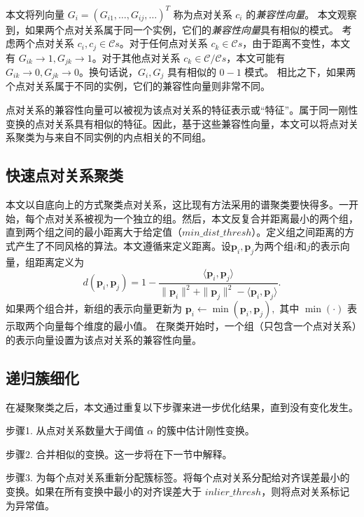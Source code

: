 本文将列向量 $G_i = (G_{i1}, \ldots , G_{ij}, \ldots)^T$ 称为点对关系 $c_i$ 的\emph{兼容性向量}。
本文观察到，如果两个点对关系属于同一个实例，它们的\emph{兼容性向量}具有相似的模式。
考虑两个点对关系 $c_i, c_j \in \mathcal{C}s$。对于任何点对关系 $c_k \in \mathcal{C}s$，由于距离不变性，本文有 $G_{ik} \rightarrow 1, G_{jk} \rightarrow 1$。对于其他点对关系 $c_k \in \mathcal{C}/\mathcal{C}s$，本文可能有 $G_{ik} \rightarrow 0, G_{jk} \rightarrow 0$。换句话说，$G_i,G_j$ 具有相似的 $0-1$ 模式。
相比之下，如果两个点对关系属于不同的实例，它们的兼容性向量则非常不同。

点对关系的兼容性向量可以被视为该点对关系的特征表示或“特征”。属于同一刚性变换的点对关系具有相似的特征。因此，基于这些兼容性向量，本文可以将点对关系聚类为与来自不同实例的内点相关的不同组。

\subsection{快速点对关系聚类}
本文以自底向上的方式聚类点对关系，这比现有方法采用的谱聚类\cite{parra2019practical}\cite{shi2021robin}要快得多。一开始，每个点对关系被视为一个独立的组。然后，本文反复合并距离最小的两个组，直到两个组之间的最小距离大于给定值（$min\_dist\_thresh$）。定义组之间距离的方式产生了不同风格的算法。本文遵循\cite{magri2014t}来定义距离。设$\boldsymbol{p}_i, \boldsymbol{p}_j$为两个组$i$和$j$的表示向量，组距离定义为
\begin{equation}
d(\boldsymbol{p}_i, \boldsymbol{p}_j)= 1-\frac{\langle \boldsymbol{p}_i,\boldsymbol{p}_j\rangle}{\parallel \boldsymbol{p}_i\parallel ^2+\parallel \boldsymbol{p}_j\parallel ^2-\langle \boldsymbol{p}_i,\boldsymbol{p}_j\rangle}.
\end{equation}
如果两个组合并，新组的表示向量更新为
$\boldsymbol{p}_i \leftarrow \min (\boldsymbol{p}_i, \boldsymbol{p}_j),$ 其中 $\min(\cdot)$ 表示取两个向量每个维度的最小值。
在聚类开始时，一个组（只包含一个点对关系）的表示向量设置为该点对关系的兼容性向量。

\subsection{递归簇细化}
\label{sec:cluster_refinement}
在凝聚聚类之后，本文通过重复以下步骤来进一步优化结果，直到没有变化发生。

步骤1. 从点对关系数量大于阈值 $\alpha$ 的簇中估计刚性变换。

步骤2. 合并相似的变换。这一步将在下一节中解释。

步骤3. 为每个点对关系重新分配簇标签。将每个点对关系分配给对齐误差最小的变换。如果在所有变换中最小的对齐误差大于 $inlier\_thresh$，则将点对关系标记为异常值。


